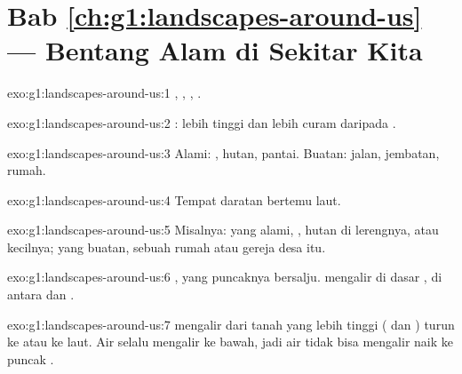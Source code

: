 \section*{Bab \ref{ch:g1:landscapes-around-us} --- Bentang Alam di Sekitar Kita}

\begin{solution}{exo:g1:landscapes-around-us:1}
, , , .
\end{solution}

\begin{solution}{exo:g1:landscapes-around-us:2}
:  lebih tinggi dan lebih curam daripada .
\end{solution}

\begin{solution}{exo:g1:landscapes-around-us:3}
Alami: , hutan, pantai. Buatan: jalan, jembatan, rumah.
\end{solution}

\begin{solution}{exo:g1:landscapes-around-us:4}
Tempat daratan bertemu laut.
\end{solution}

\begin{solution}{exo:g1:landscapes-around-us:5}
Misalnya: yang alami, , hutan di lerengnya, atau 
kecilnya; yang buatan, sebuah rumah atau gereja desa itu.
\end{solution}

\begin{solution}{exo:g1:landscapes-around-us:6}
, yang puncaknya bersalju.  mengalir di dasar , di antara
 dan .
\end{solution}

\begin{solution}{exo:g1:landscapes-around-us:7}
 mengalir dari tanah yang lebih tinggi ( dan ) turun ke
 atau ke laut. Air selalu mengalir ke bawah, jadi air tidak bisa
mengalir naik ke puncak .
\end{solution}

